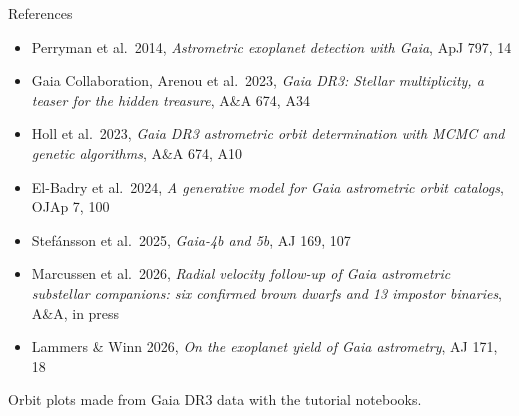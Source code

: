 \documentclass[aspectratio=169,11pt]{beamer}
\begin{document}
\begin{frame}{References}
\footnotesize
\begin{itemize}
\item Perryman et al.\ 2014, \textit{Astrometric exoplanet detection with Gaia}, ApJ 797, 14
\item Gaia Collaboration, Arenou et al.\ 2023, \textit{Gaia DR3: Stellar multiplicity, a teaser
      for the hidden treasure}, A\&A 674, A34
\item Holl et al.\ 2023, \textit{Gaia DR3 astrometric orbit determination with MCMC and
      genetic algorithms}, A\&A 674, A10
\item El-Badry et al.\ 2024, \textit{A generative model for Gaia astrometric orbit catalogs},
      OJAp 7, 100
\item Stef\'ansson et al.\ 2025, \textit{Gaia-4b and 5b}, AJ 169, 107
\item Marcussen et al.\ 2026, \textit{Radial velocity follow-up of Gaia astrometric substellar
      companions: six confirmed brown dwarfs and 13 impostor binaries}, A\&A, in press
\item Lammers \& Winn 2026, \textit{On the exoplanet yield of Gaia astrometry}, AJ 171, 18
\end{itemize}
\vspace{0.5em}
Orbit plots made from Gaia DR3 data with the tutorial notebooks.
\end{frame}
\end{document}
